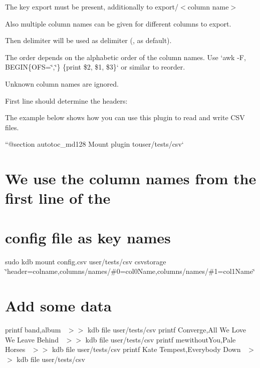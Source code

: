 \begin{DoxyItemize}
\item The key {\ttfamily export} must be present, additionally to {\ttfamily export/$<$column name$>$}
\item Also multiple column names can be given for different columns to export.
\begin{DoxyItemize}
\item Then {\ttfamily delimiter} will be used as delimiter ({\ttfamily ,} as default).
\item The order depends on the alphabetic order of the column names. Use `awk -\/F\textquotesingle{},\textquotesingle{} \textquotesingle{}B\+E\+G\+IN\{O\+FS=\char`\"{},\char`\"{}\} \{print \$2, \$1, \$3\}\textquotesingle{}` or similar to reorder.
\item Unknown column names are ignored.
\end{DoxyItemize}
\end{DoxyItemize}

First line should determine the headers\+:




The example below shows how you can use this plugin to read and write C\+SV files.

``{\ttfamily  @section autotoc\+\_\+md128 Mount plugin to}user/tests/csv` \hypertarget{autotoc_md124_autotoc_md129}{}\section{We use the column names from the first line of the}\label{autotoc_md124_autotoc_md129}
\hypertarget{autotoc_md124_autotoc_md130}{}\section{config file as key names}\label{autotoc_md124_autotoc_md130}
sudo kdb mount config.\+csv user/tests/csv csvstorage \char`\"{}header=colname,columns/names/\#0=col0\+Name,columns/names/\#1=col1\+Name\char`\"{}\hypertarget{autotoc_md124_autotoc_md131}{}\section{Add some data}\label{autotoc_md124_autotoc_md131}
printf \textquotesingle{}band,album~\newline
\textquotesingle{} $>$$>$ {\ttfamily kdb file user/tests/csv} printf \textquotesingle{}Converge,All We Love We Leave Behind~\newline
\textquotesingle{} $>$$>$ {\ttfamily kdb file user/tests/csv} printf \textquotesingle{}mewithout\+You,Pale Horses~\newline
\textquotesingle{} $>$$>$ {\ttfamily kdb file user/tests/csv} printf \textquotesingle{}Kate Tempest,Everybody Down~\newline
\textquotesingle{} $>$$>$ {\ttfamily kdb file user/tests/csv}

